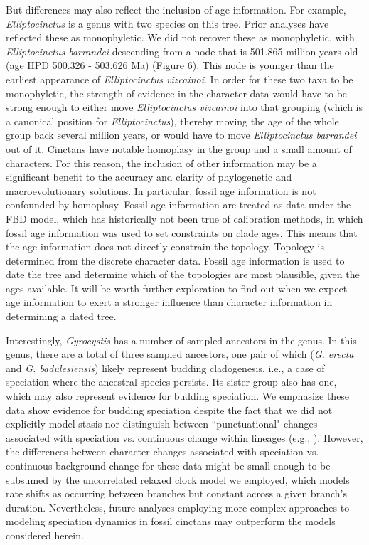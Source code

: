 \documentclass{article}
\begin{document}
But differences may also reflect the inclusion of age information.
For example, \textit{Elliptocinctus} is a genus with two species on this tree. 
Prior analyses have reflected these as monophyletic.
We did not recover these as monophyletic, with \textit{Elliptocinctus barrandei} descending from a node that is 501.865 million years old (age HPD 500.326 - 503.626 Ma) (Figure 6).
This node is younger than the earliest appearance of \textit{Elliptocinctus vizcainoi}.
In order for these two taxa to be monophyletic, the strength of evidence in the character data would have to be strong enough to either move \textit{Elliptocinctus vizcainoi} into that grouping (which is a canonical position for \textit{Elliptocinctus}), thereby moving the age of the whole group back several million years, or would have to move \textit{Elliptocinctus barrandei} out of it.
Cinctans have notable homoplasy in the group and a small amount of characters.
For this reason, the inclusion of other information may be a significant benefit to the accuracy and clarity of phylogenetic and macroevolutionary solutions.
In particular, fossil age information is not confounded by homoplasy.
Fossil age information are treated as data under the FBD model, which has historically not been true of calibration methods, in which fossil age information was used to set constraints on clade ages. 
This means that the age information does not directly constrain the topology.
Topology is determined from the discrete character data.
Fossil age information is used to date the tree and determine which of the topologies are most plausible, given the ages available.
It will be worth further exploration to find out when we expect age information to exert a stronger influence than character information in determining a dated tree.

Interestingly, \textit{Gyrocystis} has a number of sampled ancestors in the genus. In this genus, there are a total of three sampled ancestors, one pair of which (\textit{G. erecta} and \textit{G. badulesiensis}) likely represent budding cladogenesis, i.e., a case of speciation where the ancestral species persists. Its sister group also has one, which may also represent evidence for budding speciation. We emphasize these data show evidence for budding speciation despite the fact that we did not explicitly model stasis nor distinguish between ``punctuational" changes associated with speciation vs. continuous change within lineages (e.g., \citealp{EldredgeGould1972, WagnerMarcot2010}). However, the differences between character changes associated with speciation vs. continuous background change for these data might be small enough to be subsumed by the uncorrelated relaxed clock model we employed, which models rate shifts as occurring between branches but constant across a given branch's duration. Nevertheless, future analyses employing more complex approaches to modeling speciation dynamics in fossil cinctans may outperform the models considered herein.
\end{document}
